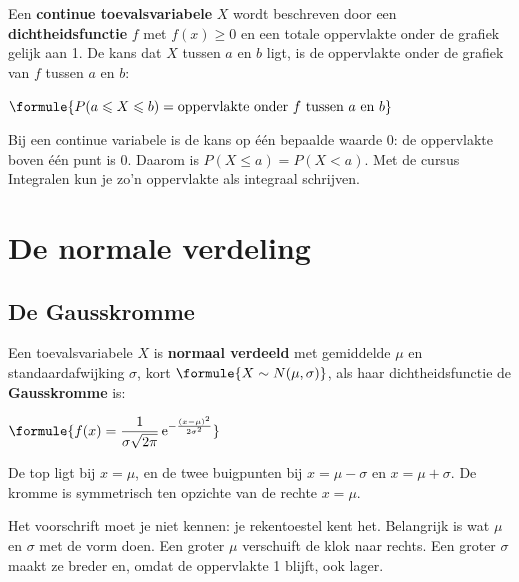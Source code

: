 \begin{theorie}
Een \textbf{\textcolor{accent}{continue toevalsvariabele}} $X$ wordt beschreven door een \textbf{\textcolor{accent}{dichtheidsfunctie}} $f$ met $f(x) \geqslant 0$ en een totale oppervlakte onder de grafiek gelijk aan 1. De kans dat $X$ tussen $a$ en $b$ ligt, is de oppervlakte onder de grafiek van $f$ tussen $a$ en $b$:

\vspace{1mm}
\qquad $\formule{P(a \leqslant X \leqslant b) = \text{oppervlakte onder } f \text{ tussen } a \text{ en } b}$
\end{theorie}

Bij een continue variabele is de kans op één bepaalde waarde 0: de oppervlakte boven één punt is 0. Daarom is $P(X \leqslant a) = P(X < a)$. Met de cursus Integralen kun je zo'n oppervlakte als integraal schrijven.

\begin{oefeningen}
\end{oefeningen}

\section{De normale verdeling}

\subsection{De Gausskromme}

\begin{theorie}
Een toevalsvariabele $X$ is \textbf{\textcolor{accent}{normaal verdeeld}} met gemiddelde $\mu$ en standaardafwijking $\sigma$, kort $\formule{X \sim N(\mu, \sigma)}$, als haar dichtheidsfunctie de \textbf{\textcolor{accent}{Gausskromme}} is:

\vspace{1mm}
\qquad $\formule{f(x) = \dfrac{1}{\sigma\sqrt{2\pi}}\, \mathrm{e}^{-\frac{(x - \mu)^2}{2\sigma^2}}}$

\vspace{1mm}
De top ligt bij $x = \mu$, en de twee buigpunten bij $x = \mu - \sigma$ en $x = \mu + \sigma$. De kromme is symmetrisch ten opzichte van de rechte $x = \mu$.
\end{theorie}

Het voorschrift moet je niet kennen: je rekentoestel kent het. Belangrijk is wat $\mu$ en $\sigma$ met de vorm doen. Een groter $\mu$ verschuift de klok naar rechts. Een groter $\sigma$ maakt ze breder en, omdat de oppervlakte 1 blijft, ook lager.

